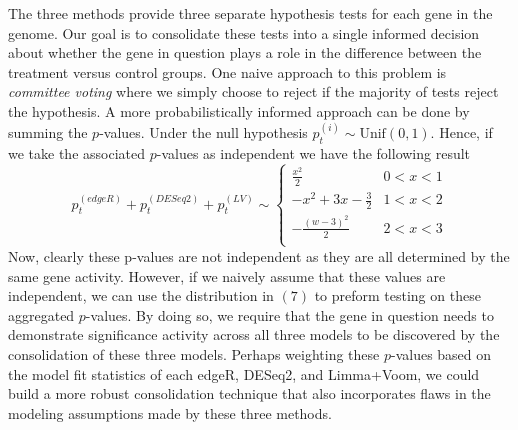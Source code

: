 \documentclass[11pt]{article}
\begin{document}
The three methods provide three separate hypothesis tests for each gene in the genome. Our goal is to consolidate these tests into a single informed decision about whether the gene in question plays a role in the difference between the treatment versus control groups. One naive approach to this problem is \textit{committee voting} where we simply choose to reject if the majority of tests reject the hypothesis. A more probabilistically informed approach can be done by summing the $p$-values. Under the null hypothesis $p_t^{(i)}\sim\text{Unif}(0,1)$. Hence, if we take the associated $p$-values as independent we have the following result 
\begin{equation}
p_t^{(edgeR)} + p_t^{(DESeq2)} + p_t^{(LV)} \sim \begin{cases}
\frac{x^2}{2} & 0<x<1\\
-x^2+3x-\frac{3}{2} & 1<x<2\\
-\frac{(w-3)^2}{2} & 2<x<3\\
\end{cases}  
\end{equation}
Now, clearly these p-values are not independent as they are all determined by the same gene activity. However, if we naively assume that these values are independent, we can use the distribution in $(7)$ to preform testing on these aggregated $p$-values. By doing so, we require that the gene in question needs to demonstrate significance activity across all three models to be discovered by the consolidation of these three models. Perhaps weighting these $p$-values based on the model fit statistics of each edgeR, DESeq2, and Limma+Voom, we could build a more robust consolidation technique that also incorporates flaws in the modeling assumptions made by these three methods.  
\end{document}
